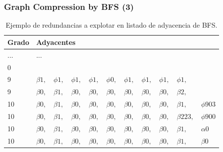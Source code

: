 \begin{frame}
\frametitle{Graph Compression by BFS (3)}

 \begin{table}%
\caption{Ejemplo de redundancias a explotar en listado de adyacencia de BFS.}
\centering
\tiny

\begin{tabular}{|l|llllllllll|}
	\toprule
	Grado & \multicolumn{9}{l}{Adyacentes} & \\
	\midrule
	\cellcolor{blanco} ... & \multicolumn{9}{l}{\cellcolor{blanco} ...} & \\
	\cellcolor{blanco} 0 & \multicolumn{9}{l}{} & \\
	\cellcolor{rojo} 9 & \cellcolor{blanco} $\beta1,$ & \cellcolor{cafe} $\phi1,$ & \cellcolor{cafe} $\phi1,$ & \cellcolor{cafe} $\phi1,$ & \cellcolor{blanco} $\phi0,$ & \cellcolor{blanco} $\phi1,$ & \cellcolor{blanco} $\phi1,$ & \cellcolor{blanco} $\phi1,$ & \cellcolor{blanco} $\phi1,$ & \\
    \cellcolor{rojo} 9 & \cellcolor{azul} $\beta0,$ & \cellcolor{azul} $\beta1,$ & \cellcolor{azul} $\beta0,$ & \cellcolor{azul} $\beta0,$ & \cellcolor{azul} $\beta0,$ & \cellcolor{azul} $\beta0,$ & \cellcolor{azul} $\beta0,$ & \cellcolor{azul} $\beta0,$ & \cellcolor{blanco} $\beta2,$ & \\
    \cellcolor{blanco} 10 &  \cellcolor{azul} $\beta0,$ & \cellcolor{azul} $\beta1,$ & \cellcolor{azul} $\beta0,$ & \cellcolor{azul} $\beta0,$ & \cellcolor{azul} $\beta0,$ & \cellcolor{azul} $\beta0,$ & \cellcolor{azul} $\beta0,$ & \cellcolor{azul} $\beta0,$  & \cellcolor{blanco} $\beta1,$ & \cellcolor{blanco} $\phi903$ \\
    \cellcolor{blanco} 10 &  \cellcolor{azul} $\beta0,$ & \cellcolor{azul} $\beta1,$ & \cellcolor{azul} $\beta0,$ & \cellcolor{azul} $\beta0,$ & \cellcolor{azul} $\beta0,$ & \cellcolor{azul} $\beta0,$ & \cellcolor{azul} $\beta0,$ & \cellcolor{azul} $\beta0,$  & \cellcolor{blanco} $\beta223,$ & \cellcolor{blanco} $\phi900$ \\
    \cellcolor{blanco} 10 &  \cellcolor{azul} $\beta0,$ & \cellcolor{azul} $\beta1,$ & \cellcolor{azul} $\beta0,$ & \cellcolor{azul} $\beta0,$ & \cellcolor{azul} $\beta0,$ & \cellcolor{azul} $\beta0,$ & \cellcolor{azul} $\beta0,$ & \cellcolor{azul} $\beta0,$  & \cellcolor{blanco} $\beta1,$ & \cellcolor{blanco} $\alpha0$ \\
    \cellcolor{amarillo} 10 & \cellcolor{verde} $\beta0,$ & \cellcolor{verde} $\beta1,$ & \cellcolor{verde} $\beta0,$ & \cellcolor{verde} $\beta0,$ & \cellcolor{verde} $\beta0,$ & \cellcolor{verde} $\beta0,$ & \cellcolor{verde} $\beta0,$ & \cellcolor{verde} $\beta0,$ & \cellcolor{amarillo} $\beta1,$ & \cellcolor{amarillo} $\beta0$ \\

\end{tabular}
\end{table}
\end{frame}
